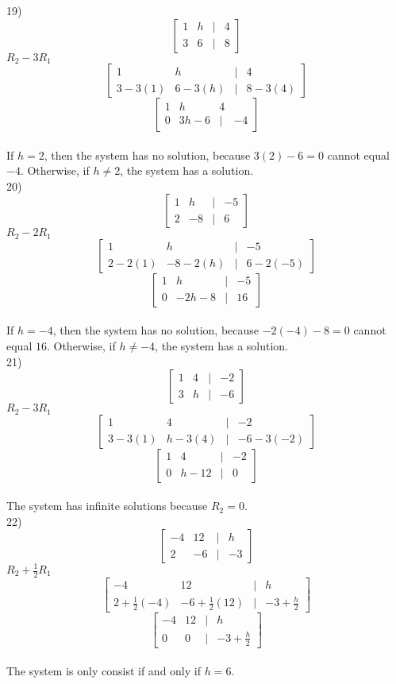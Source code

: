 \documentclass[]{article}
\begin{document}
19) \[
\begin{bmatrix}
	1 & h &|& 4\\
	3 & 6 &|& 8
\end{bmatrix}
\]
$R_2-3R_1$
\[
\begin{bmatrix}
	1&h&|&4\\
	3-3(1)&6-3(h)&|&8-3(4)
\end{bmatrix}
\]
\[
\begin{bmatrix}
	1&h&4\\
	0&3h-6&|&-4
\end{bmatrix}
\]\\
If $h=2$, then the system has no solution, because $3(2)-6=0$ cannot equal $-4$. Otherwise, if $h\neq2$, the system has a solution.\\

20) \[
\begin{bmatrix}
	1&h&|&-5\\
	2&-8&|&6
\end{bmatrix}
\]
$R_2-2R_1$
\[
\begin{bmatrix}
	1&h&|&-5\\
	2-2(1)&-8-2(h)&|&6-2(-5)
\end{bmatrix}
\]
\[
\begin{bmatrix}
	1&h&|&-5\\
	0&-2h-8&|&16
\end{bmatrix}
\]\\
If $h=-4$, then the system has no solution, because $-2(-4)-8=0$ cannot equal $16$. Otherwise, if $h\neq-4$, the system has a solution.\\

21) \[
\begin{bmatrix}
	1&4&|&-2\\
	3&h&|&-6
\end{bmatrix}
\]
$R_2-3R_1$
\[
\begin{bmatrix}
	1&4&|&-2\\
	3-3(1)&h-3(4)&|&-6-3(-2)
\end{bmatrix}
\]
\[
\begin{bmatrix}
	1&4&|&-2\\
	0&h-12&|&0
\end{bmatrix}
\]\\
The system has infinite solutions because $R_2 = 0$.\\

22) \[
\begin{bmatrix}
	-4&12&|&h\\
	2&-6&|&-3
\end{bmatrix}
\]
$R_2+\frac{1}{2}R_1$
\[
\begin{bmatrix}
	-4&12&|&h\\
	2+\frac{1}{2}(-4)&-6+\frac{1}{2}(12)&|&-3+\frac{h}{2}
\end{bmatrix}
\]
\[
\begin{bmatrix}
	-4&12&|&h\\
	0&0&|&-3+\frac{h}{2}
\end{bmatrix}
\]\\
The system is only consist if and only if $h=6$.\\
\end{document}
